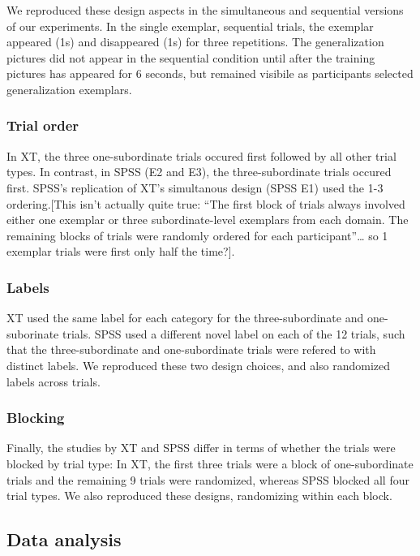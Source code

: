\documentclass[english,floatsintext,man]{apa6}
\theoremstyle{definition}
\theoremstyle{definition}
\theoremstyle{remark}
\begin{document}
We reproduced these design aspects in the simultaneous and sequential
versions of our experiments. In the single exemplar, sequential trials,
the exemplar appeared (1s) and disappeared (1s) for three repetitions.
The generalization pictures did not appear in the sequential condition
until after the training pictures has appeared for 6 seconds, but
remained visibile as participants selected generalization exemplars.

\subsubsection{Trial order}\label{trial-order}

In XT, the three one-subordinate trials occured first followed by all
other trial types. In contrast, in SPSS (E2 and E3), the
three-subordinate trials occured first. SPSS's replication of XT's
simultanous design (SPSS E1) used the 1-3 ordering.{[}This isn't
actually quite true: \enquote{The first block of trials always involved
either one exemplar or three subordinate-level exemplars from each
domain. The remaining blocks of trials were randomly ordered for each
participant}\ldots{} so 1 exemplar trials were first only half the
time?{]}.

\subsubsection{Labels}\label{labels}

XT used the same label for each category for the three-subordinate and
one-suborinate trials. SPSS used a different novel label on each of the
12 trials, such that the three-subordinate and one-subordinate trials
were refered to with distinct labels. We reproduced these two design
choices, and also randomized labels across trials.

\subsubsection{Blocking}\label{blocking}

Finally, the studies by XT and SPSS differ in terms of whether the
trials were blocked by trial type: In XT, the first three trials were a
block of one-subordinate trials and the remaining 9 trials were
randomized, whereas SPSS blocked all four trial types. We also
reproduced these designs, randomizing within each block.

\subsection{Data analysis}\label{data-analysis}
\end{document}

